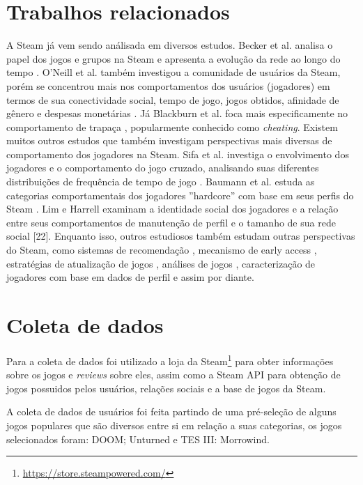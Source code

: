 \documentclass[12pt]{article}
\begin{document}
\section{Trabalhos relacionados} \label{sec:firstpage}

A Steam já vem sendo análisada em diversos estudos. Becker et al. analisa o papel dos jogos e grupos na Steam e apresenta a evolução da rede ao longo do tempo \cite{becker2012analysis}. O'Neill et al. também investigou a comunidade de usuários da Steam, porém se concentrou mais nos comportamentos dos usuários (jogadores) em termos de sua conectividade social, tempo de jogo, jogos obtidos, afinidade de gênero e despesas monetárias \cite{o2016condensing}. Já Blackburn et al. foca mais especificamente no comportamento de trapaça \cite{blackburn2011cheaters}, popularmente conhecido como \textit{cheating}. Existem muitos outros estudos que também investigam perspectivas mais diversas de comportamento dos jogadores na Steam. Sifa et al. investiga o envolvimento dos jogadores e o comportamento do jogo cruzado, analisando suas diferentes distribuições de frequência de tempo de jogo \cite{sifa2014playtime,sifa2015large}. Baumann et al. estuda as categorias comportamentais dos jogadores ''hardcore'' com base em seus perfis do Steam \cite{baumann2018hardcore}. Lim e Harrell examinam a identidade social dos jogadores e a relação entre seus comportamentos de manutenção de perfil e o tamanho de sua rede social [22]. Enquanto isso, outros estudiosos também estudam outras perspectivas do Steam, como sistemas de recomendação \cite{bertens2018machine}, mecanismo de early access \cite{lin2018empirical}, estratégias de atualização de jogos \cite{lin2017studying}, análises de jogos \cite{lin2019empirical}, caracterização de jogadores com base em dados de perfil \cite{li2019statistical} e assim por diante.

\section{Coleta de dados}

Para a coleta de dados foi utilizado a loja da Steam\footnote{\url{https://store.steampowered.com/}\label{fn:steamstore}} para obter informações sobre os jogos e \textit{reviews} sobre eles, assim como a Steam API para obtenção de jogos possuidos pelos usuários, relações sociais e a base de jogos da Steam.

A coleta de dados de usuários foi feita partindo de uma pré-seleção de alguns jogos populares que são diversos entre si em relação a suas categorias, os jogos selecionados foram: DOOM; Unturned e TES III: Morrowind.
\end{document}
